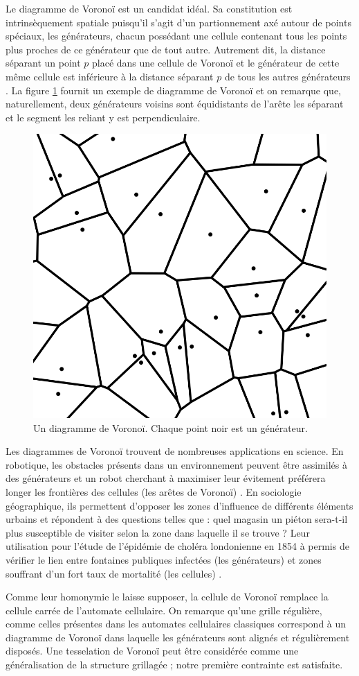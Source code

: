 \documentclass[12pt]{article}
\begin{document}
Le diagramme de Voronoï est un candidat idéal. Sa constitution est
intrinsèquement spatiale puisqu'il s'agit d'un partionnement axé
autour de points spéciaux, les générateurs, chacun possédant une
cellule contenant tous les points plus proches de ce générateur que de
tout autre. Autrement dit, la distance séparant un point $p$ placé
dans une cellule de Voronoï et le générateur de cette même cellule est
inférieure à la distance séparant $p$ de tous les autres générateurs
\cite{Edwards1993}. La figure \ref{fig:voronoi} fournit un exemple de
diagramme de Voronoï et on remarque que, naturellement, deux
générateurs voisins sont équidistants de l'arête les séparant et le
segment les reliant y est perpendiculaire.

\begin{figure}[h]
  \centering
  \includegraphics[width=0.5\linewidth]{images/voronoi.png}
  \caption{Un diagramme de Voronoï. Chaque point noir est un générateur.}
  \label{fig:voronoi}
\end{figure}

Les diagrammes de Voronoï trouvent de nombreuses applications en
science. En robotique, les obstacles présents dans un environnement
peuvent être assimilés à des générateurs et un robot cherchant à
maximiser leur évitement préférera longer les frontières des cellules
(les arêtes de Voronoï) \cite{Garrido2006}. En sociologie
géographique, ils permettent d'opposer les zones d'influence de
différents éléments urbains et répondent à des questions telles que :
quel magasin un piéton sera-t-il plus susceptible de visiter selon la
zone dans laquelle il se trouve ? Leur utilisation pour l'étude de
l'épidémie de choléra londonienne en 1854 à permis de vérifier le lien
entre fontaines publiques infectées (les générateurs) et zones
souffrant d'un fort taux de mortalité (les cellules)
\cite{Thomas2010}.

Comme leur homonymie le laisse supposer, la cellule de Voronoï
remplace la cellule carrée de l'automate cellulaire. On remarque
qu'une grille régulière, comme celles présentes dans les automates
cellulaires classiques correspond à un diagramme de Voronoï dans
laquelle les générateurs sont alignés et régulièrement disposés. Une
tesselation de Voronoï peut être considérée comme une généralisation
de la structure grillagée ; notre première contrainte est satisfaite.
\end{document}
